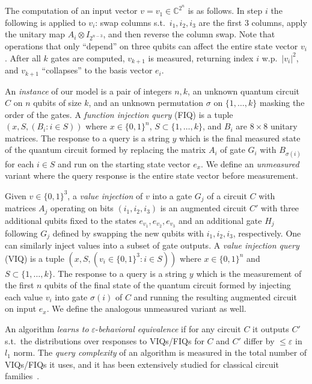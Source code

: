 \documentclass{colt2015}
\newcommand{\C}{\mathbb{C}}
\begin{document}
The computation of an input vector $v = v_1 \in \C^{2^n}$ 
is as follows. In step $i$ the following  is applied to $v_i$:
swap columns s.t.\ $i_1, i_2, i_3$ are the first $3$ columns, apply the
unitary map $A_i \otimes I_{2^{n-3}}$, and then  reverse the column
swap. Note that operations that only ``depend'' on three qubits can
affect the entire state vector $v_i$. After all $k$ gates are computed, 
$v_{k+1}$ is measured, returning index $i$ w.p.\
$|v_i|^2$, and $v_{k+1}$ ``collapses'' to the basis vector $e_i$. 

An \emph{instance} of our model is a pair of integers $n,k$, an unknown
quantum circuit $C$ on $n$ qubits of size $k$, and an unknown permutation
$\sigma$ on $\{ 1,\dots, k\}$ masking the order of the gates. A \emph{function
injection query} (FIQ) is a tuple $(x, S, ( B_i : i \in S ))$ where $x \in \{
0,1 \}^n$, $S \subset \{ 1, \dots, k \}$, and $B_i$ are $8 \times 8$ unitary
matrices. The response to a query is a string $y$ which is the final measured
state of the quantum circuit formed by replacing the matrix $A_i$ of gate $G_i$
with $B_{\sigma(i)}$ for each $i \in S$ and run on the starting state vector
$e_x$. We define an \emph{unmeasured} variant where the query response is the
entire state vector before measurement.

Given $v \in \{0,1\}^3$, a \emph{value injection} of $v$ into a gate $G_j$ of a
circuit $C$ with matrices $A_j$ operating on bits $(i_1, i_2, i_3)$ is an
augmented circuit $C'$ with three additional qubits fixed to the states
$e_{v_1}, e_{v_2}, e_{v_3}$ and an additional gate $H_j$ following $G_j$
defined by swapping the new qubits with $i_1, i_2, i_3$, respectively. One can
similarly inject values into a subset of gate outputs. A \emph{value injection
query} (VIQ) is a tuple $(x, S, ( v_i \in \{0,1\}^3 : i \in S))$ where $x \in
\{ 0,1 \}^n$ and $S \subset \{ 1, \dots, k \}$. The response to a query is a
string $y$ which is the measurement of the first $n$ qubits of the final state
of the quantum circuit formed by injecting each value $v_i$ into gate
$\sigma(i)$ of $C$ and running the resulting augmented circuit on input $e_x$.
We define the analogous unmeasured variant as well.

An algorithm \emph{learns to} $\varepsilon$-\emph{behavioral equivalence}
if for any circuit $C$ it
outputs $C'$ s.t.\ the distributions over responses to VIQs/FIQs for $C$ and $C'$ differ by $\le \varepsilon$ in $l_1$ norm. 
The \emph{query complexity} of an algorithm is measured in the total number
of VIQs/FIQs it uses, and it has been extensively studied for classical circuit families~\citep{jAngluinACR08,jAngluinACER09,AngluinACW2009}.
\end{document}
